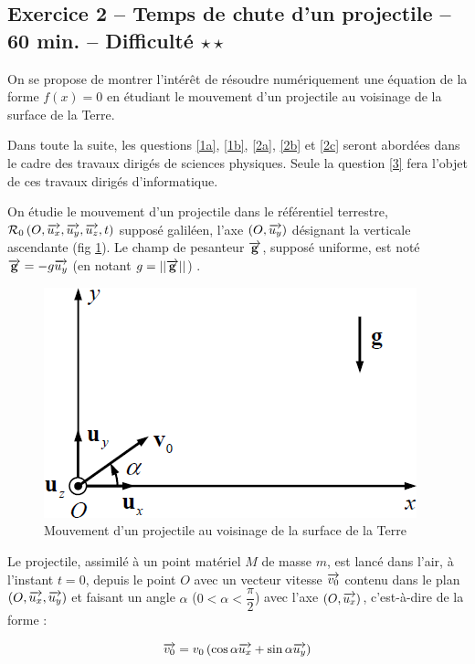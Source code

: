 \documentclass[10pt,oneside]{article}
\begin{document}
\subsection*{Exercice 2 -- Temps de chute d'un projectile -- 60 min. -- Difficulté $\star\star$}
 
\setcounter{subparagraph}{0}
\setcounter{equation}{0}
On se propose de montrer l’intérêt de résoudre numériquement une équation de la forme $f(x)= 0$ en 
étudiant le mouvement d’un projectile au voisinage de la surface de la Terre. 
\begin{rem}

Dans toute la suite, les questions \ref{1a}, \ref{1b}, \ref{2a}, \ref{2b} et \ref{2c} seront abordées dans le cadre des travaux 
dirigés de sciences physiques. Seule la question \ref{3} fera l’objet de ces travaux dirigés 
d’informatique. 

\end{rem}

On étudie le mouvement d’un projectile dans le référentiel terrestre, $\mathcal{R}_0\left(O, \overrightarrow{u_x}, \overrightarrow{u_y}, \overrightarrow{u_z}, t \right)$ supposé galiléen, l’axe $\left( O, \overrightarrow{u_y}\right)$
 désignant la verticale ascendante (fig \ref{fig1}). Le champ de pesanteur $\overrightarrow{\mathbf{g}}$, supposé 
uniforme, est noté $\overrightarrow{\mathbf{g}} = -g\overrightarrow{u_y}$ (en notant $g = ||\overrightarrow{\mathbf{g}}||$) .

\begin{figure}[!ht]
\centering
\includegraphics[width=.4\textwidth]{images/fig1}
\caption{Mouvement d'un projectile au voisinage de la surface de la Terre}
\label{fig1}
\end{figure}

Le projectile, assimilé à un point matériel $M$ de masse $m$, est lancé dans l’air, à l’instant $t = 0 $, depuis le
point $O$ avec un vecteur vitesse $\overrightarrow{v_0}$ contenu dans le plan $\left(O,\overrightarrow{u_x},\overrightarrow{u_y}\right)$ et faisant un angle $\alpha$ ($0<\alpha<\dfrac{\pi}{2}$) avec l'axe $(O,\overrightarrow{u_x})$, c'est-à-dire de la forme : 

\begin{equation}
\overrightarrow{v_0} = v_0\left(\cos\alpha \overrightarrow{u_x} + \sin\alpha \overrightarrow{u_y}\right)
\end{equation}
\end{document}

